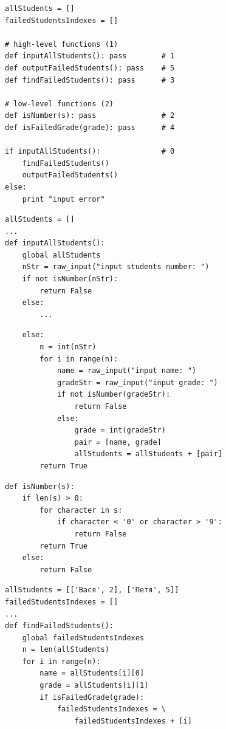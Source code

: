 {\begin{frame}[fragile]
  \begin{verbatim}
allStudents = []
failedStudentsIndexes = []

# high-level functions (1)
def inputAllStudents(): pass        # 1
def outputFailedStudents(): pass    # 5
def findFailedStudents(): pass      # 3

# low-level functions (2)
def isNumber(s): pass               # 2
def isFailedGrade(grade): pass      # 4

if inputAllStudents():              # 0
    findFailedStudents()
    outputFailedStudents()
else:
    print "input error"
  \end{verbatim}
\end{frame}

\begin{frame}[fragile]
  \begin{verbatim}
allStudents = []
...
def inputAllStudents():
    global allStudents
    nStr = raw_input("input students number: ")
    if not isNumber(nStr):
        return False
    else:
        ...
  \end{verbatim}
\end{frame}

\begin{frame}[fragile]
  \begin{verbatim}
    else:
        n = int(nStr)
        for i in range(n):
            name = raw_input("input name: ")
            gradeStr = raw_input("input grade: ")
            if not isNumber(gradeStr):
                return False
            else:
                grade = int(gradeStr)
                pair = [name, grade]
                allStudents = allStudents + [pair]
        return True
  \end{verbatim}
\end{frame}

\begin{frame}[fragile]
  \begin{verbatim}
def isNumber(s):
    if len(s) > 0:
        for character in s:
            if character < '0' or character > '9':
                return False
        return True
    else:
        return False
  \end{verbatim}
\end{frame}

\begin{frame}[fragile]
  \begin{verbatim}
allStudents = [['Вася', 2], ['Петя', 5]]
failedStudentsIndexes = []
...
def findFailedStudents():
    global failedStudentsIndexes
    n = len(allStudents)
    for i in range(n):
        name = allStudents[i][0]
        grade = allStudents[i][1]
        if isFailedGrade(grade):
            failedStudentsIndexes = \
                failedStudentsIndexes + [i]
  \end{verbatim}
\end{frame}

}

